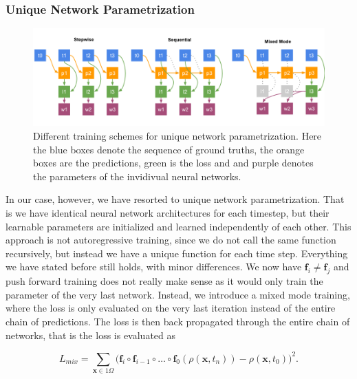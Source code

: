 \documentclass{article}
\begin{document}
\subsubsection{Unique Network Parametrization}

\begin{figure}[h]
    \centering
    \includegraphics[width=0.9\linewidth]{img/training.png}
    \caption{Different training schemes for unique network parametrization. Here the blue boxes denote the sequence of ground truths, the orange boxes are the predictions, green is the loss and and purple denotes the parameters of the invidivual neural networks.}
    \label{fig:autoreg}
\end{figure}

In our case, however, we have resorted to unique network parametrization. That is we have identical neural network architectures for each timestep, but their learnable parameters are initialized and learned independently of each other. This approach is not autoregressive training, since we do not call the same function recursively, but instead we have a unique function for each time step. Everything we have stated before still holds, with minor differences. We now have $\mathbf{f}_i \neq \mathbf{f}_j$ and push forward training does not really make sense as it would only train the parameter of the very last network. Instead, we introduce a mixed mode training, where the loss is only evaluated on the very last iteration instead of the entire chain of predictions. The loss is then back propagated through the entire chain of networks, that is the loss is evaluated as

\begin{equation}
\label{mix}
    L_{mix} = \sum_{\mathbf{x} \in 1 \Omega} \Biggl(\mathbf{f}_i \circ \mathbf{f}_{i-1} \circ \dots \circ \mathbf{f}_0 (\rho(\mathbf{x}, t_{n})) - \rho(\mathbf{x}, t_{0})\Biggr)^2.
\end{equation}
\end{document}
